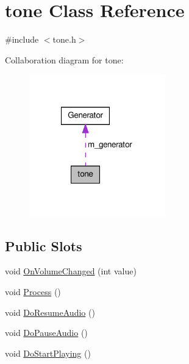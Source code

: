 \hypertarget{classtone}{\section{tone Class Reference}
\label{classtone}
}


{\ttfamily \#include $<$tone.\-h$>$}



Collaboration diagram for tone\-:\nopagebreak
\begin{figure}[H]
\begin{center}
\leavevmode
\includegraphics[width=167pt]{classtone__coll__graph}
\end{center}
\end{figure}
\subsection*{Public Slots}
\begin{DoxyCompactItemize}
\item 
void \hyperlink{classtone_a07ecdcbc212bfa5a48db8c4e61edb94d}{On\-Volume\-Changed} (int value)
\item 
void \hyperlink{classtone_a622c2c46b44e8325f2961c5b60a1c5af}{Process} ()
\item 
void \hyperlink{classtone_add8491d03d8b82453b42a236b111c02a}{Do\-Resume\-Audio} ()
\item 
void \hyperlink{classtone_abe84dc57a9c7097d1632dc2f88ab2991}{Do\-Pause\-Audio} ()
\item 
void \hyperlink{classtone_aab27a99690337d475f6be5188798c732}{Do\-Start\-Playing} ()
\end{DoxyCompactItemize}
